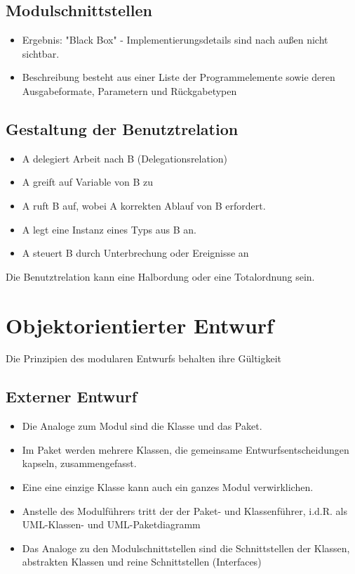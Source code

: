 \subsection{Modulschnittstellen}
\begin{itemize}
    \item Ergebnis: "Black Box" - Implementierungsdetails sind nach außen nicht sichtbar.
    \item Beschreibung besteht aus einer Liste der Programmelemente sowie deren Ausgabeformate, Parametern und Rückgabetypen
\end{itemize}

\subsection{Gestaltung der Benutztrelation}
\begin{itemize}
    \item A delegiert Arbeit nach B (Delegationsrelation)
    \item A greift auf Variable von B zu
    \item A ruft B auf, wobei A korrekten Ablauf von B erfordert. 
    \item A legt eine Instanz eines Typs aus B an.
    \item A steuert B durch Unterbrechung oder Ereignisse an
\end{itemize}
Die Benutztrelation kann eine Halbordung oder eine Totalordnung sein.

\section{Objektorientierter Entwurf}

Die Prinzipien des modularen Entwurfs behalten ihre Gültigkeit

\subsection{Externer Entwurf}
\begin{itemize}
    \item Die Analoge zum Modul sind die Klasse und das Paket.
    \item Im Paket werden mehrere Klassen, die gemeinsame Entwurfsentscheidungen kapseln, zusammengefasst.
    \item Eine eine einzige Klasse kann auch ein ganzes Modul verwirklichen.
    \item Anstelle des Modulführers tritt der der Paket- und Klassenführer, i.d.R. als UML-Klassen- und UML-Paketdiagramm
    \item Das Analoge zu den Modulschnittstellen sind die Schnittstellen der Klassen, abstrakten Klassen und reine Schnittstellen (Interfaces)
\end{itemize}


